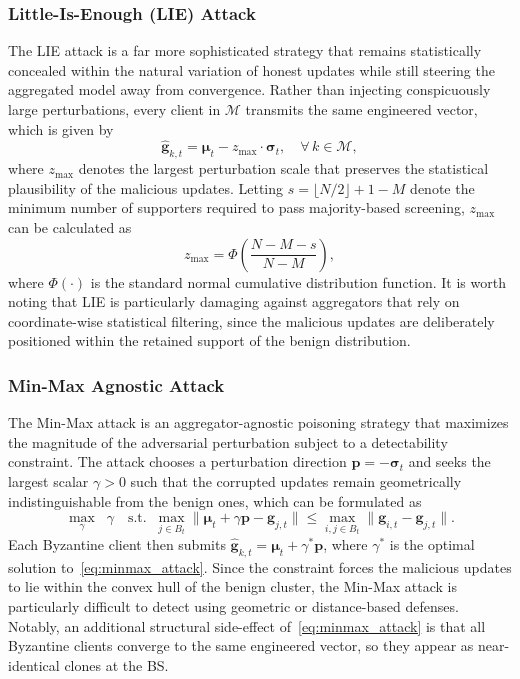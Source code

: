 \documentclass[journal]{IEEEtran}
\begin{document}
\subsubsection{Little-Is-Enough (LIE) Attack~\cite{baruch2019little}}
The LIE attack is a far more sophisticated strategy that remains statistically concealed within the natural variation of honest updates while still steering the aggregated model away from convergence. Rather than injecting conspicuously large perturbations, every client in $\mathcal{M}$ transmits the same engineered vector, which is given by
\begin{equation}
\hat{\mathbf{g}}_{k,t} = \boldsymbol{\mu}_t - z_{\max} \cdot \boldsymbol{\sigma}_t, \quad \forall\, k \in \mathcal{M},
\label{eq:lie_attack}
\end{equation}
where $z_{\max}$ denotes the largest perturbation scale that preserves the statistical plausibility of the malicious updates. Letting $s = \lfloor N/2 \rfloor + 1 - M$ denote the minimum number of supporters required to pass majority-based screening, $z_{\max}$ can be calculated as
\begin{equation}
z_{\max} = \Phi\left(\frac{N - M - s}{N - M}\right),
\label{eq:zmax}
\end{equation}
where $\Phi(\cdot)$ is the standard normal cumulative distribution function. It is worth noting that LIE is particularly damaging against aggregators that rely on coordinate-wise statistical filtering, since the malicious updates are deliberately positioned within the retained support of the benign distribution.

\subsubsection{Min-Max Agnostic Attack~\cite{shejwalkar2021manipulating}}
The Min-Max attack is an aggregator-agnostic poisoning strategy that maximizes the magnitude of the adversarial perturbation subject to a detectability constraint. The attack chooses a perturbation direction $\mathbf{p} = -\boldsymbol{\sigma}_t$ and seeks the largest scalar $\gamma > 0$ such that the corrupted updates remain geometrically indistinguishable from the benign ones, which can be formulated as
\begin{equation}
\max_{\gamma} \;\; \gamma \quad \text{s.t.} \;\; \max_{j \in B_t} \|\boldsymbol{\mu}_t + \gamma \mathbf{p} - \mathbf{g}_{j,t}\| \leq \max_{i,j \in B_t} \|\mathbf{g}_{i,t} - \mathbf{g}_{j,t}\|.
\label{eq:minmax_attack}
\end{equation}
Each Byzantine client then submits $\hat{\mathbf{g}}_{k,t} = \boldsymbol{\mu}_t + \gamma^* \mathbf{p}$, where $\gamma^*$ is the optimal solution to~\eqref{eq:minmax_attack}. Since the constraint forces the malicious updates to lie within the convex hull of the benign cluster, the Min-Max attack is particularly difficult to detect using geometric or distance-based defenses. Notably, an additional structural side-effect of~\eqref{eq:minmax_attack} is that all Byzantine clients converge to the same engineered vector, so they appear as near-identical clones at the BS.
\end{document}
